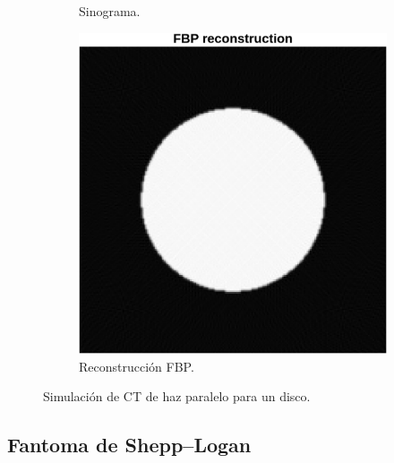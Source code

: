 \documentclass[11pt]{article}
\begin{document}
\begin{figure}[H]
\begin{subfigure}[b]{0.34\textwidth}
  \caption{Sinograma.}
\end{subfigure}\hfill
\begin{subfigure}[b]{0.30\textwidth}
  \includegraphics[width=\linewidth]{figures/disk_reconstruction.png}
  \caption{Reconstrucción FBP.}
\end{subfigure}
\caption{Simulación de CT de haz paralelo para un disco.}
\label{fig:disk}
\end{figure}
\FloatBarrier

\subsection{Fantoma de Shepp–Logan}
\end{document}
